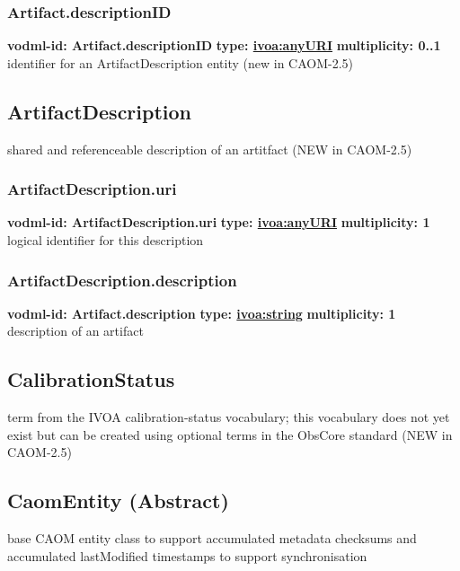     \subsubsection{Artifact.descriptionID}
      \textbf{vodml-id: Artifact.descriptionID} \newline
      \textbf{type: \hyperref[sect:ivoa]{ivoa:anyURI}} \newline
      \textbf{multiplicity: 0..1} \newline
      identifier for an ArtifactDescription entity (new in CAOM-2.5)

  \subsection{ArtifactDescription}
  \label{sect:ArtifactDescription}
    shared and referenceable description of an artitfact (NEW in CAOM-2.5)

    \subsubsection{ArtifactDescription.uri}
      \textbf{vodml-id: ArtifactDescription.uri} \newline
      \textbf{type: \hyperref[sect:ivoa]{ivoa:anyURI}} \newline
      \textbf{multiplicity: 1} \newline
      logical identifier for this description

    \subsubsection{ArtifactDescription.description}
      \textbf{vodml-id: Artifact.description} \newline
      \textbf{type: \hyperref[sect:ivoa]{ivoa:string}} \newline
      \textbf{multiplicity: 1} \newline
      description of an artifact

  \subsection{CalibrationStatus}
  \label{sect:CalibrationStatus}
    term from the IVOA calibration-status vocabulary; this vocabulary does not yet exist but can be created using optional terms in the ObsCore standard (NEW in CAOM-2.5)

  \subsection{CaomEntity (Abstract)}
  \label{sect:CaomEntity}
    base CAOM entity class to support accumulated metadata checksums and accumulated lastModified timestamps to support synchronisation


